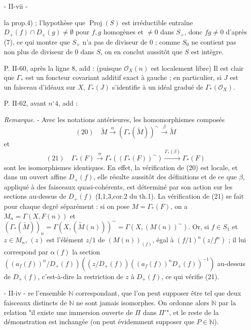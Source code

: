 \newpage


- II-vii -

la prop.4) ; l'hypothèse que $\operatorname{Proj}(S)$ est irréductible entraîne $D_+(f) \cap D_+(g) \neq \emptyset$ pour $f,g$ homogènes et $\neq 0$ dans $S_+$, donc $fg \neq 0$ d'après (7), ce qui montre que $S_+$ n'a pas de diviseur de $0$ ; comme $S_0$ ne contient pas non plus de diviseur de $0$ dans $S$, on en conclut aussitôt que $S$ est intègre.

P. II-60, après la ligne 8, add :
(puisque $\mathcal{O}_X(n)$ est localement libre)
Il est clair que $\Gamma_*$ est un foncteur covariant additif exact à gauche ; en particulier, si $J$ est un faisceau d'idéaux sur $X$, $\Gamma_*(J)$ s'identifie à un idéal gradué de $\Gamma_*(\mathcal{O}_X)$.

P. II-62, avant $n^\circ 4$, add :

\emph{Remarque}. - Avec les notations antérieures, les homomorphismes composés
$$(20) \quad \tilde{M} \xrightarrow{\alpha} (\Gamma_*(\tilde{M}))^{\sim} \xrightarrow{\beta} \tilde{M}$$
et
$$(21) \quad \Gamma_*(F) \xrightarrow{\alpha} \Gamma_*((\Gamma_*(F))^{\sim}) \xrightarrow{\Gamma_*(\beta)} \Gamma_*(F)$$
sont les isomorphismes identiques. En effet, la vérification de (20) est locale, et dans un ouvert affine $D_+(f)$, elle résulte aussitôt des définitions et de ce que $\beta$, appliqué à des faisceaux quasi-cohérents, est déterminé par son action sur les sections au-dessus de $D_+(f)$ (I,1,3,cor.2 du th.1). La vérification de (21) se fait pour chaque degré séparément : si on pose $M = \Gamma_*(F)$, on a $M_n = \Gamma(X, F(n))$ et $(\Gamma_*(\tilde{M}))_n = \Gamma(X, (\tilde{M}(n)))^{\sim} = \Gamma(X, (M(n))^{\sim})$. Or, si $f \in S_1$ et $z \in M_n$, $(z)$ est l'élément $z/1$ de $(M(n))_{(f)}$, égal à $(f/1)^n (z/f^n)$ ; il lui correspond par $\alpha(f)$ la section $((a_f(f))^n / D_+(f))((z/D_+(f))((a_f(f))^n D_+(f))^{-1})$ au-dessus de $D_+(f)$, c'est-à-dire la restriction de $z$ à $D_+(f)$, ce qui vérifie (21).

\newpage


- II-iv -
re l'ensemble $\mathbb{N}$ correspondant, que l'on peut supposer être tel que deux faisceaux distincts de $\mathbb{N}$ ne sont jamais isomorphes. On ordonne alors $\mathbb{N}$ par la relation "il existe une immersion ouverte de $\Pi$ dans $\Pi'$", et le reste de la démonstration est inchangée (on peut évidemment supposer que $P \in \mathbb{N}$).

